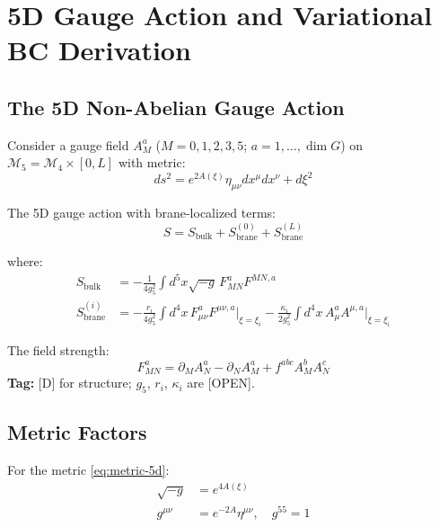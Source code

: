 \documentclass[11pt,a4paper]{article}
\begin{document}
\section{5D Gauge Action and Variational BC Derivation}
\label{sec:5d-action}

\subsection{The 5D Non-Abelian Gauge Action}

Consider a gauge field $A_M^a$ ($M = 0,1,2,3,5$; $a = 1,\ldots,\dim G$) on
$\mathcal{M}_5 = \mathcal{M}_4 \times [0,L]$ with metric:
\begin{equation}
  ds^2 = e^{2A(\xi)} \eta_{\mu\nu} dx^\mu dx^\nu + d\xi^2
  \label{eq:metric-5d}
\end{equation}

The 5D gauge action with brane-localized terms:
\begin{equation}
  \boxed{S = S_{\text{bulk}} + S_{\text{brane}}^{(0)} + S_{\text{brane}}^{(L)}}
  \label{eq:full-action}
\end{equation}

where:
\begin{align}
  S_{\text{bulk}} &= -\frac{1}{4g_5^2} \int d^5x \sqrt{-g} \, F_{MN}^a F^{MN,a}
  \label{eq:bulk-action} \\
  S_{\text{brane}}^{(i)} &= -\frac{r_i}{4g_5^2} \int d^4x \, F_{\mu\nu}^a F^{\mu\nu,a}
    \Big|_{\xi=\xi_i} - \frac{\kappa_i}{2g_5^2} \int d^4x \, A_\mu^a A^{\mu,a}
    \Big|_{\xi=\xi_i}
  \label{eq:brane-action}
\end{align}

The field strength:
\begin{equation}
  F_{MN}^a = \partial_M A_N^a - \partial_N A_M^a + f^{abc} A_M^b A_N^c
  \label{eq:field-strength}
\end{equation}
\textbf{Tag:} [D] for structure; $g_5$, $r_i$, $\kappa_i$ are [OPEN].

\subsection{Metric Factors}

For the metric \eqref{eq:metric-5d}:
\begin{align}
  \sqrt{-g} &= e^{4A(\xi)}
  \label{eq:sqrt-g} \\
  g^{\mu\nu} &= e^{-2A} \eta^{\mu\nu}, \quad g^{55} = 1
  \label{eq:inverse-metric}
\end{align}
\end{document}
